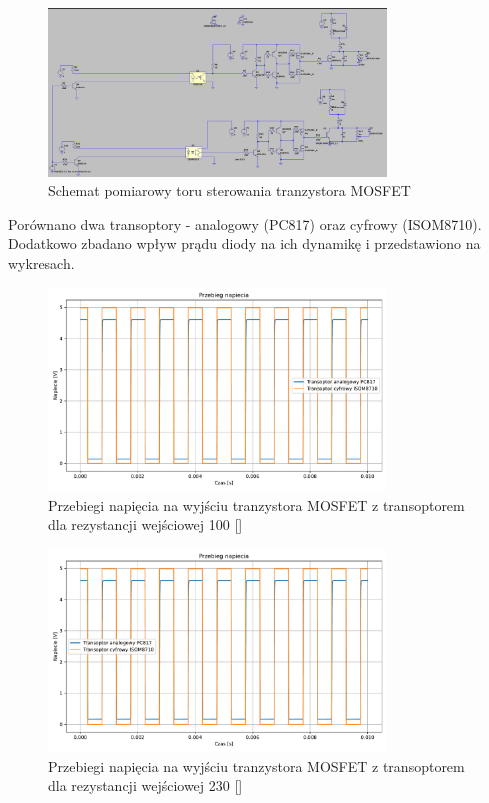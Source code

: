 \documentclass[11pt]{article}
\begin{document}
\begin{figure}[H]
\centering
\includegraphics[width=0.8\textwidth]{aun1_transoptor.png}
\caption{Schemat pomiarowy toru sterowania tranzystora MOSFET}
\end{figure}

Porównano dwa transoptory - analogowy (PC817) oraz cyfrowy (ISOM8710). 
Dodatkowo zbadano wpływ prądu diody na ich dynamikę i przedstawiono na wykresach.\\

\begin{figure}[H]
\centering
\includegraphics[width=0.8\textwidth]{aun1_gate_circuit_digital_vs_analog_rin100ohm.pdf}
\caption{Przebiegi napięcia na wyjściu tranzystora MOSFET z transoptorem dla rezystancji wejściowej 100 [\Omega]}
\end{figure}

\begin{figure}[H]
\centering
\includegraphics[width=0.8\textwidth]{aun1_gate_circuit_digital_vs_analog_rin230ohm.pdf}
\caption{Przebiegi napięcia na wyjściu tranzystora MOSFET z transoptorem dla rezystancji wejściowej 230 [\Omega]}
\end{figure}
\end{document}
